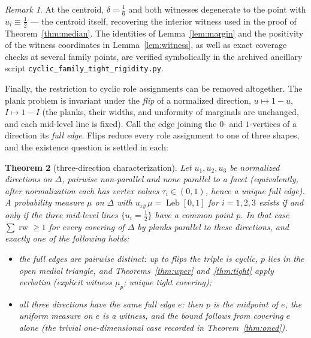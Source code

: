 \documentclass{aims}
\numberwithin{equation}{section}
\theoremstyle{plain}
\newtheorem{theorem}{Theorem}[section]
\theoremstyle{definition}
\theoremstyle{remark}
\newtheorem{remark}[theorem]{Remark}
\newcommand{\rw}{\operatorname{rw}}
\newcommand{\Leb}{\operatorname{Leb}}
\begin{document}
\begin{remark}
At the centroid, $\delta=\tfrac16$ and both witnesses degenerate to the point
with $u_i\equiv\tfrac12$ --- the centroid itself, recovering the interior
witness used in the proof of Theorem~\ref{thm:median}. The identities of
Lemma~\ref{lem:margin} and the positivity of the witness coordinates in
Lemma~\ref{lem:witness}, as well as exact coverage checks
at several family points, are verified symbolically in the archived ancillary
script \texttt{cyclic\_family\_tight\_rigidity.py}.
\end{remark}

Finally, the restriction to cyclic role assignments can be removed altogether.
The plank problem is invariant under the \emph{flip} of a normalized direction,
$u\mapsto1-u$, $I\mapsto1-I$ (the planks, their widths, and uniformity of
marginals are unchanged, and each mid-level line is fixed). Call the edge
joining the $0$- and $1$-vertices of a direction its \emph{full edge}. Flips
reduce every role assignment to one of three shapes, and the existence question
is settled in each:

\begin{theorem}[three-direction characterization]\label{thm:char}
Let $u_1,u_2,u_3$ be normalized directions on $\Delta$, pairwise non-parallel and
none parallel to a facet (equivalently, after normalization each has vertex
values $\tau_i\in(0,1)$, hence a unique full edge).
A probability measure $\mu$ on $\Delta$ with $u_{i\#}\mu=\Leb[0,1]$ for
$i=1,2,3$ exists if and only if the three mid-level lines $\{u_i=\tfrac12\}$
have a common point $p$. In that case $\sum\rw\ge1$ for every covering of
$\Delta$ by planks parallel to these directions, and exactly one of the
following holds:
\begin{itemize}
\item[(a)] the full edges are pairwise distinct: up to flips the triple is
cyclic, $p$ lies in the open medial triangle, and Theorems~\ref{thm:wper}
and~\ref{thm:tight} apply verbatim (explicit witness $\mu_p$; unique tight
covering);
\item[(b)] all three directions have the same full edge $e$: then $p$ is the
midpoint of $e$, the uniform measure on $e$ is a witness, and the bound follows
from covering $e$ alone (the trivial one-dimensional case recorded in
Theorem~\ref{thm:oned}).
\end{itemize}
\end{theorem}
\end{document}
